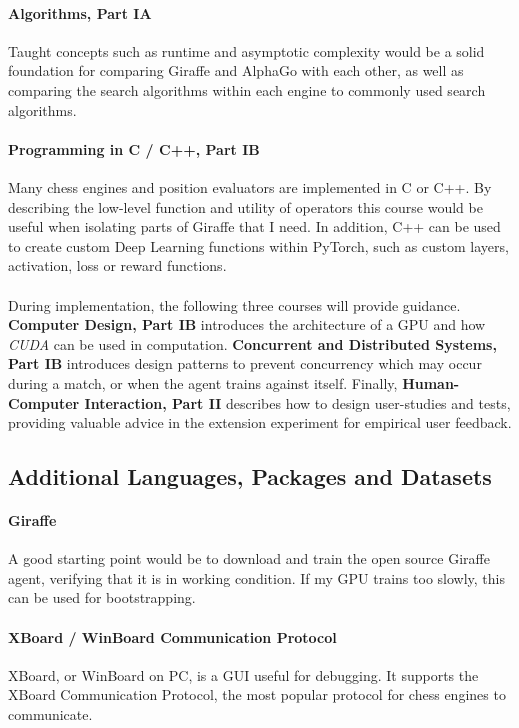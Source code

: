 \documentclass[a4paper]{article}
\begin{document}
\paragraph{Algorithms, Part IA} Taught concepts such as runtime and asymptotic complexity would be a solid foundation for comparing Giraffe and AlphaGo with each other, as well as comparing the search algorithms within each engine to commonly used search algorithms.

\paragraph{Programming in C / C++, Part IB} Many chess engines and position evaluators are implemented in C or C++. By describing the low-level function and utility of operators this course would be useful when isolating parts of Giraffe that I need. In addition, C++ can be used to create custom Deep Learning functions within PyTorch, such as custom layers, activation, loss or reward functions.

\paragraph{} During implementation, the following three courses will provide guidance. \textbf{Computer Design, Part IB} introduces the architecture of a GPU and how \textit{CUDA} can be used in computation. \textbf{Concurrent and Distributed Systems, Part IB} introduces design patterns to prevent concurrency which may occur during a match, or when the agent trains against itself. Finally, \textbf{Human-Computer Interaction, Part II} describes how to design user-studies and tests, providing valuable advice in the extension experiment for empirical user feedback.


\subsection*{Additional Languages, Packages and Datasets}

\paragraph{Giraffe} A good starting point would be to download and train the open source Giraffe agent, verifying that it is in working condition. If my GPU trains too slowly, this can be used for bootstrapping.

\paragraph{XBoard / WinBoard Communication Protocol} XBoard, or WinBoard on PC, is a GUI useful for debugging. It supports the XBoard Communication Protocol, the most popular protocol for chess engines to communicate.
\end{document}
